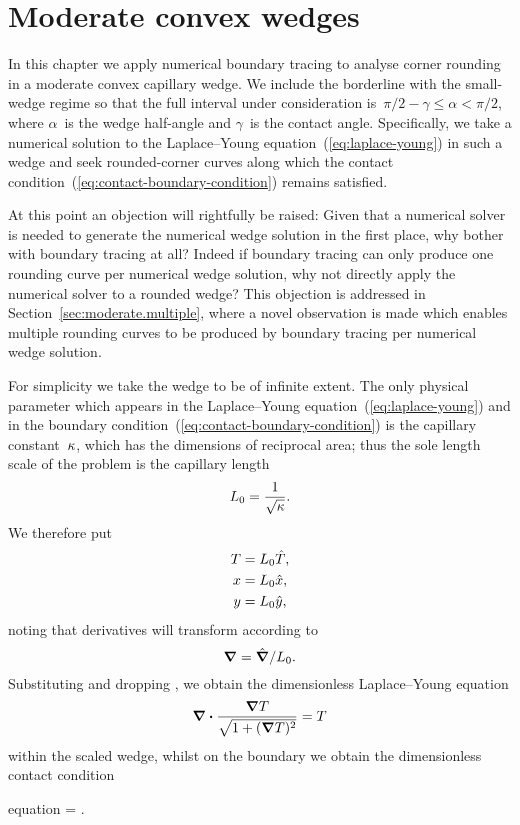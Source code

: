 \chapter{Moderate convex wedges}
\label{ch:moderate}

In this chapter
we apply numerical boundary tracing to analyse corner rounding
in a moderate convex capillary wedge.
We include the borderline with the small-wedge regime
so that the full interval under consideration
is~$\pi/2 - \gamma \le \alpha < \pi/2$,
where $\alpha$~is the wedge half-angle
and $\gamma$~is the contact angle.
Specifically, we take a numerical solution
to the Laplace--Young equation~(\ref{eq:laplace-young}) in such a wedge
and seek rounded-corner curves along which
the contact condition~(\ref{eq:contact-boundary-condition})
remains satisfied.

At this point an objection will rightfully be raised:
Given that a numerical solver is needed
to generate the numerical wedge solution in the first place,
why bother with boundary tracing at all?
Indeed if boundary tracing can only produce
one rounding curve per numerical wedge solution,
why not directly apply the numerical solver to a rounded wedge?
This objection is addressed
in Section~\ref{sec:moderate.multiple},
where a novel observation is made
which enables multiple rounding curves to be produced by boundary tracing
per numerical wedge solution.

\thematicbreak

For simplicity we take the wedge to be of infinite extent.
The only physical parameter which appears
in the Laplace--Young equation~(\ref{eq:laplace-young})
and in the boundary condition~(\ref{eq:contact-boundary-condition})
is the capillary constant~$\kappa$,
which has the dimensions of reciprocal area;
thus the sole length scale of the problem
is the capillary length
\begin{equation}
  L_0 = \frac{1}{\sqrt{\kappa}}.
  \label{eq:capillary-length}
\end{equation}
We therefore put
\begin{align}
  T &= L_0 \hat{T}, \label{eq:capillary-height-scaling} \\
  x &= L_0 \hat{x}, \label{eq:capillary-x-scaling} \\
  y &= L_0 \hat{y}, \label{eq:capillary-y-scaling}
\end{align}
noting that derivatives will transform according to
\begin{equation}
  \mathop{}\!\boldsymbol{\mathbf{\nabla}} = \mathop{}\!\hat{\mathop{}\!\boldsymbol{\mathbf{\nabla}}} / L_0.
  \label{eq:capillary-del-scaling}
\end{equation}
Substituting and dropping \scalingmarks,
we obtain the dimensionless Laplace--Young equation
\begin{equation}
  \mathop{}\!\boldsymbol{\mathbf{\nabla}} \boldsymbol{\cdot} \frac{\mathop{}\!\boldsymbol{\mathbf{\nabla}} T}{\sqrt{1 + (\mathop{}\!\boldsymbol{\mathbf{\nabla}} T)^2}} =  T
  \label{eq:scaled-laplace-young}
\end{equation}
within the scaled wedge,
whilst on the boundary we obtain the dimensionless contact condition
\begin{important}{equation}
  \normalvec \dotp {} = \cos\gamma.
  \label{eq:scaled-contact-boundary-condition}
\end{important}

